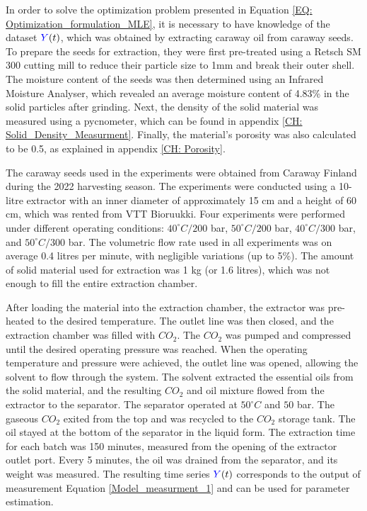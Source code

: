 \documentclass[../Article_Model_Parameters.tex]{subfiles}
\begin{document}
	
	\label{CH: Experiments}
	
	In order to solve the optimization problem presented in Equation \ref{EQ: Optimization_formulation_MLE}, it is necessary to have knowledge of the dataset ${\color{blue}Y}(t)$, which was obtained by extracting caraway oil from caraway seeds. To prepare the seeds for extraction, they were first pre-treated using a Retsch SM 300 cutting mill to reduce their particle size to 1mm and break their outer shell. The moisture content of the seeds was then determined using an Infrared Moisture Analyser, which revealed an average moisture content of 4.83\% in the solid particles after grinding. Next, the density of the solid material was measured using a pycnometer, which can be found in appendix \ref{CH: Solid_Density_Measurment}. Finally, the material's porosity was also calculated to be 0.5, as explained in appendix \ref{CH: Porosity}.
	
	The caraway seeds used in the experiments were obtained from Caraway Finland during the 2022 harvesting season. The experiments were conducted using a 10-litre extractor with an inner diameter of approximately 15 cm and a height of 60 cm, which was rented from VTT Bioruukki. Four experiments were performed under different operating conditions: $40^\circ C / 200$ bar, $50^\circ C / 200$ bar, $40^\circ C / 300$ bar, and $50^\circ C / 300$ bar. The volumetric flow rate used in all experiments was on average 0.4 litres per minute, with negligible variations (up to 5\%). The amount of solid material used for extraction was 1 kg (or 1.6 litres), which was not enough to fill the entire extraction chamber.
	
	After loading the material into the extraction chamber, the extractor was pre-heated to the desired temperature. The outlet line was then closed, and the extraction chamber was filled with $CO_2$. The $CO_2$ was pumped and compressed until the desired operating pressure was reached. When the operating temperature and pressure were achieved, the outlet line was opened, allowing the solvent to flow through the system. The solvent extracted the essential oils from the solid material, and the resulting $CO_2$ and oil mixture flowed from the extractor to the separator. The separator operated at $50^\circ C$ and $50$ bar. The gaseous $CO_2$ exited from the top and was recycled to the $CO_2$ storage tank. The oil stayed at the bottom of the separator in the liquid form. The extraction time for each batch was 150 minutes, measured from the opening of the extractor outlet port. Every 5 minutes, the oil was drained from the separator, and its weight was measured. The resulting time series ${\color{blue}Y}(t)$ corresponds to the output of measurement Equation \ref{Model_measurment_1} and can be used for parameter estimation.
	
\end{document}
